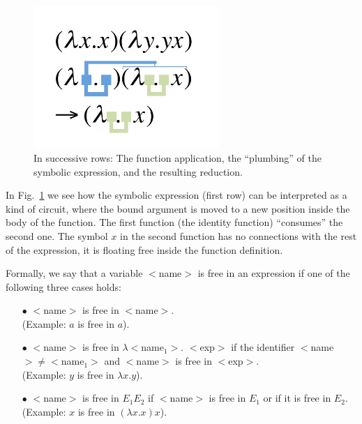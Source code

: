 \documentclass[12pt]{article}
\begin{document}
\begin{figure}[htb]
\centerline{\includegraphics[width=7cm]{lamb3}}
\caption{In successive rows: The function application, the ``plumbing'' of the symbolic expression, and the resulting reduction.\label{fig2}}
\end{figure} 

In Fig.~\ref{fig2} we see how the symbolic expression (first row) can be interpreted as a kind of circuit, where the bound argument is moved to a new position inside the body of the function. The first function (the identity function) ``consumes'' the second one. The symbol $x$ in the second function has no connections with the rest of the expression, it is floating free inside the function definition.

Formally, we say that a variable $<$name$>$ is free in an expression if one of the following three cases holds:
\begin{itemize}
\item[$\bullet$] $<$name$>$ is free in $<$name$>$. \\(Example: $a$ is free in $a$).
\item[$\bullet$] $<$name$>$ is free in $\lambda$$<$name$_1>$. $<$exp$>$ if the identifier $<$name$>\neq$$<$name$_1>$ and $<$name$>$ is free in $<$exp$>$. \\(Example: $y$ is free in $\lambda x.y$).
\item[$\bullet$] $<$name$>$ is free in $E_1E_2$ if $<$name$>$ is free in  $E_1$ or if it is free in $E_2$.\\ (Example: $x$ is free in $(\lambda x.x)x$).
\end{itemize}
\end{document}
